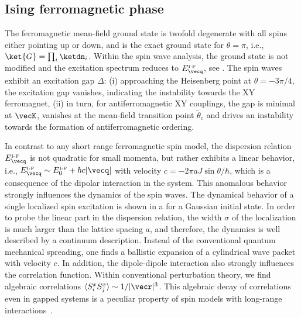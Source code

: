 \subsection{Ising ferromagnetic phase}


The ferromagnetic mean-field ground state is twofold degenerate with all spins
either pointing up or down, and is the exact ground state for $\theta =
\pi$, i.e., $\ket{G} = \prod_{i} \ketdn_{i}$. Within the spin wave analysis,
the ground state is not modified and the excitation
spectrum reduces to $E_{{\vecq}}^{\mbox{\tiny I-F}}$, see .
The spin waves exhibit an excitation gap $\Delta$: (i) approaching the
Heisenberg point at $\theta = -3 \pi /4$, the excitation gap
vanishes, indicating the instability towards the XY ferromagnet, (ii) in
turn, for antiferromagnetic XY couplings, the gap is minimal at $\vecK$,
vanishes at the mean-field transition point $\tilde{\theta}_{c}$ and drives an instability towards the formation
of antiferromagnetic ordering.

In contrast to any short range ferromagnetic spin model, the
dispersion relation $E_{{\vecq}}^{\mbox{\tiny I-F}}$ is not quadratic for small momenta,
but rather exhibits a linear behavior, i.e., $E_{{\vecq}}^{\mbox{\tiny I-F}} \sim E_{0}^{\mbox{\tiny I-F}}+ \hbar c |{\vecq}|$ with
velocity $c= - 2 \pi a J \sin \theta /\hbar$, which is a consequence of the dipolar interaction in
the system. This anomalous behavior strongly influences the dynamics
of the spin waves.
The dynamical behavior of a single localized spin excitation is shown in a for a Gaussian initial state.
In order to probe the linear part in the dispersion relation, the width $\sigma$
of the localization is much larger than the lattice spacing $a$, and therefore, the dynamics is
well described by a continuum description.
Instead of the conventional quantum mechanical spreading, one finds
a ballistic expansion of a cylindrical wave packet with velocity $c$.
In addition, the dipole-dipole interaction also strongly influences the correlation function.
Within conventional perturbation theory, we find algebraic correlations $\langle S_{i}^{x} S_{j}^{x}\rangle \sim 1/|{\vecr}|^3$.
This algebraic decay of correlations even in gapped systems is a peculiar property of
spin models with long-range interactions~\cite{Deng2005,Schuch2006}.



